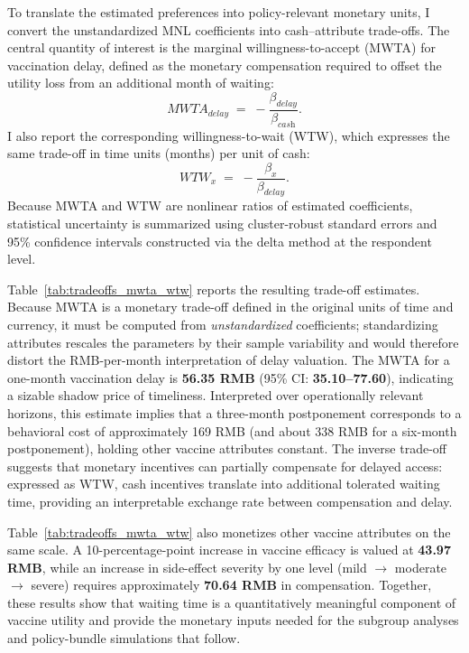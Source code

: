 \documentclass[doublespacing]{utdthesis}
\begin{document}
To translate the estimated preferences into policy-relevant monetary units, I convert the unstandardized MNL coefficients into cash--attribute trade-offs. The central quantity of interest is the marginal willingness-to-accept (MWTA) for vaccination delay, defined as the monetary compensation required to offset the utility loss from an additional month of waiting:
\begin{equation}
MWTA_{\textit{delay}} \;=\; -\frac{\beta_{\textit{delay}}}{\beta_{\textit{cash}}}.
\label{eq:mwta}
\end{equation}
I also report the corresponding willingness-to-wait (WTW), which expresses the same trade-off in time units (months) per unit of cash:
\begin{equation}
WTW_{x} \;=\; -\frac{\beta_{x}}{\beta_{\textit{delay}}}.
\label{eq:wtw}
\end{equation}
Because MWTA and WTW are nonlinear ratios of estimated coefficients, statistical uncertainty is summarized using cluster-robust standard errors and 95\% confidence intervals constructed via the delta method at the respondent level.

Table~\ref{tab:tradeoffs_mwta_wtw} reports the resulting trade-off estimates. Because MWTA is a monetary trade-off defined in the original units of time and currency, it must be computed from \emph{unstandardized} coefficients; standardizing attributes rescales the parameters by their sample variability and would therefore distort the RMB-per-month interpretation of delay valuation.
The MWTA for a one-month vaccination delay is \textbf{56.35 RMB} (95\% CI: \textbf{35.10--77.60}), indicating a sizable shadow price of timeliness. Interpreted over operationally relevant horizons, this estimate implies that a three-month postponement corresponds to a behavioral cost of approximately 169 RMB (and about 338 RMB for a six-month postponement), holding other vaccine attributes constant. The inverse trade-off suggests that monetary incentives can partially compensate for delayed access: expressed as WTW, cash incentives translate into additional tolerated waiting time, providing an interpretable exchange rate between compensation and delay.

Table~\ref{tab:tradeoffs_mwta_wtw} also monetizes other vaccine attributes on the same scale. A 10-percentage-point increase in vaccine efficacy is valued at \textbf{43.97 RMB}, while an increase in side-effect severity by one level (mild $\rightarrow$ moderate $\rightarrow$ severe) requires approximately \textbf{70.64 RMB} in compensation. Together, these results show that waiting time is a quantitatively meaningful component of vaccine utility and provide the monetary inputs needed for the subgroup analyses and policy-bundle simulations that follow.
\end{document}
